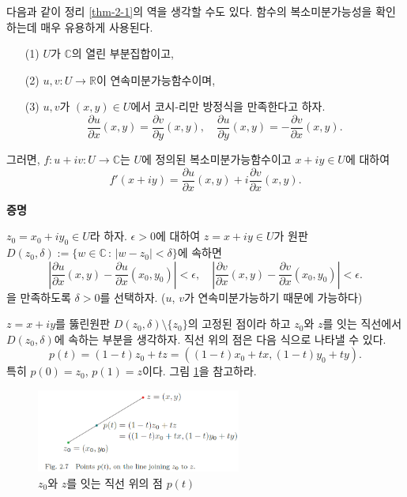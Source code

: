 다음과 같이 정리 \ref{thm-2-1}의 역을 생각할 수도 있다.
함수의 복소미분가능성을 확인하는데 매우 유용하게 사용된다.

\begin{salttheorem}{}{} \label{thm-2-2}

\begin{itemize}
\item[(1)] $U$가 $\mathbb C$의 열린 부분집합이고,
\item[(2)] $u,v: U\to \mathbb R$이 연속미분가능함수이며,
\item[(3)] $u,v$가 $(x,y)\in U$에서 코시-리만 방정식을 만족한다고 하자.
$$
\dfrac{\partial u}{\partial x}(x, y) = \dfrac{\partial v}{\partial y}(x, y),
\quad
\dfrac{\partial u}{\partial y}(x, y) = - \dfrac{\partial v}{\partial x}(x, y).
$$
\end{itemize}
그러면, $f:u+iv: U\to \mathbb C$는 $U$에 정의된 복소미분가능함수이고
$x+iy\in U$에 대하여
$$
f'(x+iy) = \dfrac{\partial u}{\partial x}(x, y) + i \dfrac{\partial v}{\partial x}(x, y).
$$
\end{salttheorem}

{\bf 증명}

$z_0 = x_0 + iy_0 \in U$라 하자.
$\epsilon>0$에 대하여 
$z=x+iy\in U$가 원판 $D(z_0,\delta) := \{ w \in\mathbb C \,:\, |w-z_0| < \delta \}$에
속하면
\begin{equation}\label{eq-2-7}
\left| \dfrac{\partial u}{\partial x}(x,y) - \dfrac{\partial u}{\partial x}(x_0,y_0) \right| < \epsilon,
\quad
\left| \dfrac{\partial v}{\partial x}(x,y) - \dfrac{\partial v}{\partial x}(x_0,y_0) \right| < \epsilon.
\end{equation}
을 만족하도록 $\delta>0$를 선택하자.
($u$, $v$가 연속미분가능하기 때문에 가능하다)

$z=x+iy$를 뚫린원판 $D(z_0,\delta)\setminus\{ z_0\}$의 고정된 점이라 하고
$z_0$와 $z$를 잇는 직선에서 $D(z_0,\delta)$에 속하는 부분을 생각하자.
직선 위의 점은 다음 식으로 나타낼 수 있다.
\[
p(t) = (1-t)z_0 + tz = \left( (1-t)x_0+tx, (1-t)y_0+ty \right).
\]
특히 $p(0)=z_0$, $p(1)=z$이다. 그림 \ref{fig-2-7}을 참고하라.

\begin{figure}[!h]
\begin{center}
\includegraphics[width=0.6\textwidth]{./SaltChapter/fig-2-7}
\end{center}
\caption{$z_0$와 $z$를 잇는 직선 위의 점 $p(t)$}
\label{fig-2-7}
\end{figure}

